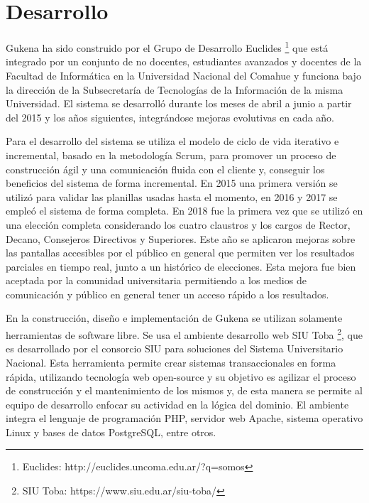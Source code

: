\section{Desarrollo}
Gukena ha sido construido por el Grupo de Desarrollo Euclides \footnote{Euclides: http://euclides.uncoma.edu.ar/?q=somos} que está integrado por un conjunto de no docentes, estudiantes avanzados y docentes de la Facultad de Informática en la Universidad Nacional del Comahue y funciona bajo la dirección de la Subsecretaría de Tecnologías de la Información de la misma Universidad. El sistema se desarrolló durante los meses de abril a junio a partir del 2015 y los años siguientes, integrándose mejoras evolutivas en cada año.

Para el desarrollo del sistema se utiliza el modelo de ciclo de vida iterativo e incremental, basado en la metodología Scrum, para promover un proceso de construcción ágil y una comunicación fluida con el cliente y, conseguir los beneficios del sistema de forma incremental. En 2015 una primera versión se utilizó para validar las planillas usadas hasta el momento, en 2016 y 2017 se empleó el sistema de forma completa.  En 2018 fue la primera vez que se utilizó en una elección completa considerando los cuatro claustros y los cargos de Rector, Decano, Consejeros Directivos y Superiores. Este año se aplicaron mejoras sobre las pantallas accesibles por el público en general que permiten ver los resultados parciales en tiempo real, junto a un histórico de elecciones. Esta mejora fue bien aceptada por la comunidad universitaria permitiendo a los medios de comunicación y público en general tener un acceso rápido a los resultados.

En la construcción, diseño e implementación de Gukena se utilizan solamente herramientas de software libre. Se usa el ambiente desarrollo web SIU Toba \footnote{SIU Toba: https://www.siu.edu.ar/siu-toba/}, que es desarrollado por el consorcio SIU para soluciones del Sistema Universitario Nacional. Esta herramienta  permite crear sistemas transaccionales en forma rápida, utilizando tecnología web open-source y su objetivo es agilizar el proceso de construcción y el mantenimiento de los mismos y, de esta manera se permite al equipo de desarrollo enfocar su actividad en la lógica del dominio.  El ambiente integra el lenguaje de programación PHP, servidor web Apache, sistema operativo Linux y bases de datos PostgreSQL, entre otros.

